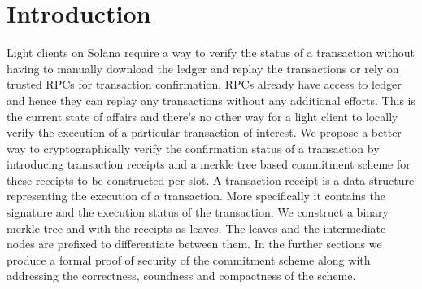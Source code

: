 \section{Introduction}
Light clients on Solana require a way to verify the status of a transaction without 
having to manually download the ledger and replay the transactions or rely on trusted 
RPCs for transaction confirmation. RPCs already have access to ledger and hence they
can replay any transactions without any additional efforts. This is the current state 
of affairs and there's no other way for a light client to locally verify the execution 
of a particular transaction of interest. We propose a better way to cryptographically
verify the confirmation status of a transaction by introducing transaction receipts 
and a merkle tree based commitment scheme for these receipts to be constructed per slot.
A transaction receipt is a data structure representing the execution of a transaction. 
More specifically it contains the signature and the execution status of the transaction. 
We construct a binary merkle tree and with the receipts as leaves. The leaves and the 
intermediate nodes are prefixed to differentiate between them. In the further sections 
we produce a formal proof of security of the commitment scheme along with addressing 
the correctness, soundness and compactness of the scheme.
